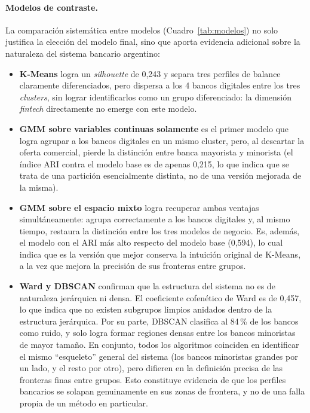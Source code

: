 \documentclass[11pt,a4paper]{article}
\begin{document}
\paragraph{Modelos de contraste.} La comparación sistemática entre modelos (Cuadro~\ref{tab:modelos})
no solo justifica la elección del modelo final, sino que aporta evidencia adicional sobre la naturaleza
del sistema bancario argentino:
\begin{itemize}
  \item \textbf{K-Means} logra un \textit{silhouette} de 0,243 y separa tres perfiles de balance
  claramente diferenciados, pero dispersa a los 4 bancos digitales entre los tres \textit{clusters},
  sin lograr identificarlos como un grupo diferenciado: la dimensión \textit{fintech} directamente no
  emerge con este modelo.
  \item \textbf{GMM sobre variables continuas solamente} es el primer modelo que logra agrupar a los
  bancos digitales en un mismo cluster, pero, al descartar la oferta comercial, pierde la distinción
  entre banca mayorista y minorista (el índice ARI contra el modelo base es de apenas 0,215, lo que
  indica que se trata de una partición esencialmente distinta, no de una versión mejorada de la misma).
  \item \textbf{GMM sobre el espacio mixto} logra recuperar ambas ventajas simultáneamente: agrupa
  correctamente a los bancos digitales y, al mismo tiempo, restaura la distinción entre los tres modelos
  de negocio. Es, además, el modelo con el ARI más alto respecto del modelo base (0,594), lo cual indica
  que es la versión que mejor conserva la intuición original de K-Means, a la vez que mejora la
  precisión de sus fronteras entre grupos.
  \item \textbf{Ward y DBSCAN} confirman que la estructura del sistema no es de naturaleza jerárquica ni
  densa. El coeficiente cofenético de Ward es de 0,457, lo que indica que no existen subgrupos limpios
  anidados dentro de la estructura jerárquica. Por su parte, DBSCAN clasifica al 84\,\% de los bancos
  como ruido, y solo logra formar regiones densas entre los bancos minoristas de mayor tamaño. En
  conjunto, todos los algoritmos coinciden en identificar el mismo ``esqueleto'' general del sistema
  (los bancos minoristas grandes por un lado, y el resto por otro), pero difieren en la definición
  precisa de las fronteras finas entre grupos. Esto constituye evidencia de que los perfiles bancarios
  se solapan genuinamente en sus zonas de frontera, y no de una falla propia de un método en particular.
\end{itemize}
\end{document}
